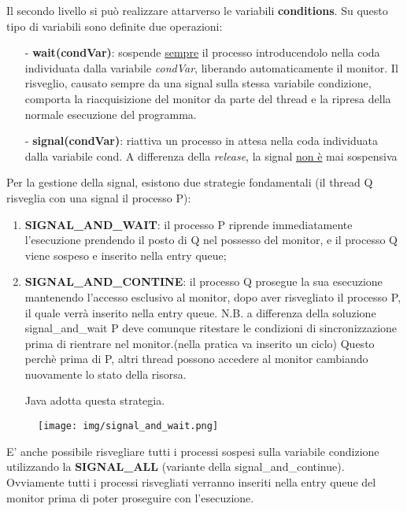 \documentclass{article}
\begin{document}
\noindent Il secondo livello si può realizzare attarverso le variabili \textbf{conditions}. Su questo tipo di variabili 
sono definite due operazioni:
\begin{itemize}
    \item[-] \textbf{wait(condVar)}: sospende \underline{sempre} il processo introducendolo nella coda individuata dalla variabile
    \textit{condVar}, liberando automaticamente il monitor. Il risveglio, causato sempre da una signal sulla stessa variabile condizione,
    comporta la riacquisizione del monitor da parte del thread e la ripresa della normale esecuzione del programma.
    \item[-] \textbf{signal(condVar)}: riattiva un processo in attesa nella coda individuata dalla variabile cond. A differenza della
     \textit{release}, la signal \underline{non è} mai sospensiva
\end{itemize}

\noindent Per la gestione della signal, esistono due strategie fondamentali (il thread Q risveglia con una signal il processo P):
\begin{enumerate}
    \item \textbf{SIGNAL\_AND\_WAIT}: il processo P riprende immediatamente l'esecuzione prendendo il posto di Q nel possesso del monitor,
    e il processo Q viene sospeso e inserito nella entry queue;
    \item \textbf{SIGNAL\_AND\_CONTINE}: il processo Q prosegue la sua esecuzione mantenendo l'accesso esclusivo al monitor, 
    dopo aver risvegliato il processo P, il quale verrà inserito nella entry queue. N.B. a differenza della soluzione 
    signal\_and\_wait P deve comunque ritestare le condizioni di sincronizzazione prima di rientrare nel monitor.(nella pratica va inserito un ciclo) 
    Questo perchè prima di P, altri thread possono accedere al monitor cambiando nuovamente lo stato della risorsa.

    \noindent Java adotta questa strategia.
\end{enumerate}

\begin{figure}[h!]
    \begin{center}
        \texttt{[image: img/signal\_and\_wait.png]}     
    \end{center}
\end{figure}

\noindent E' anche possibile risvegliare tutti i processi sospesi sulla variabile condizione utilizzando la 
\textbf{SIGNAL\_ALL} (variante della signal\_and\_continue). Ovviamente tutti i processi risvegliati verranno inseriti nella entry queue
del monitor prima di poter proseguire con l'esecuzione.
\end{document}
